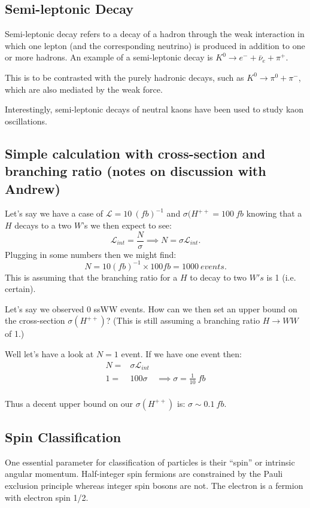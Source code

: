 \documentclass{article}
\begin{document}
\subsection{Semi-leptonic Decay}
Semi-leptonic decay refers to a decay of a hadron through the weak interaction in which one lepton (and the corresponding neutrino) is produced in addition to one or more hadrons. An example of a semi-leptonic decay is $K^{0} \longrightarrow e^{-} + \bar{\nu}_{e} + \pi^{+}$.

This is to be contrasted with the purely hadronic decays, such as $K^{0} \longrightarrow \pi^{0} + \pi^{-}$, which are also mediated by the weak force.

Interestingly, semi-leptonic decays of neutral kaons have been used to study kaon oscillations.

\subsection{Simple calculation with cross-section and branching ratio (notes on discussion with Andrew)}
Let's say we have a case of $\mathcal{L} = 10 \ (fb)^{-1}$ and $\sigma(H^{++} = 100 \ fb$ knowing that a $H$ decays to a two $W$'s we then expect to see: $$ \mathcal{L}_{int} = \frac{N}{\sigma} \implies N = \sigma \mathcal{L}_{int}.$$ Plugging in some numbers then we might find: $$ N = 10 (fb)^{-1} \times 100 fb = 1000 \ events.$$ This is assuming that the branching ratio for a $H$ to decay to two $W's$ is 1 (i.e. certain).

Let's say we observed 0 ssWW events. How can we then set an upper bound on the cross-section $\sigma(H^{++})$? (This is still assuming a branching ratio $H \longrightarrow WW$ of 1.)

Well let's have a look at $N = 1$ event. If we have one event then: 
\begin{eqnarray}
N =& \sigma \mathcal{L}_{int}  \nonumber  \\
1 =& 100 \sigma & \implies \sigma = \frac{1}{10} \ fb \nonumber \\ 
\end{eqnarray}

Thus a decent upper bound on our $\sigma (H^{++})$ is: $\sigma \sim 0.1 \ fb$.
\subsection{Spin Classification}
One essential parameter for classification of particles is their ``spin'' or intrinsic angular momentum. Half-integer spin fermions are constrained by the Pauli exclusion principle whereas integer spin bosons are not. The electron is a fermion with electron spin 1/2.
\end{document}
